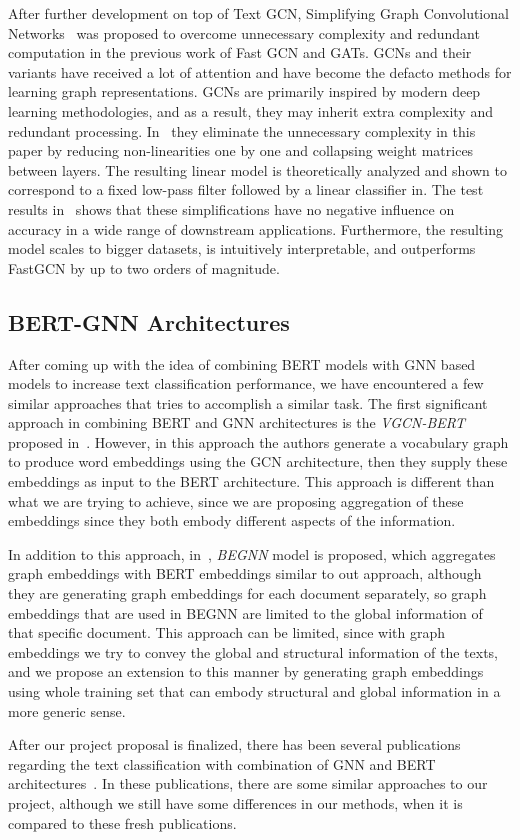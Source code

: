 After further development on top of Text GCN, Simplifying Graph Convolutional Networks~\autocite{simplfyingGCN2019} was proposed to overcome unnecessary complexity and redundant computation in the previous work of Fast GCN and GATs. GCNs and their variants have received a lot of attention and have become the defacto methods for learning graph representations. GCNs are primarily inspired by modern deep learning methodologies, and as a result, they may inherit extra complexity and redundant processing. In~\autocite{simplfyingGCN2019} they eliminate the unnecessary complexity in this paper by reducing non-linearities one by one and collapsing weight matrices between layers. The resulting linear model is theoretically analyzed and shown to correspond to a fixed low-pass filter followed by a linear classifier in. The test results in~\autocite{simplfyingGCN2019} shows that these simplifications have no negative influence on accuracy in a wide range of downstream applications. Furthermore, the resulting model scales to bigger datasets, is intuitively interpretable, and outperforms FastGCN by up to two orders of magnitude.

\subsection{BERT-GNN Architectures}\label{sec:related:bertgnn}
After coming up with the idea of combining BERT models with GNN based models to increase text classification performance, we have encountered a few similar approaches that tries to accomplish a similar task. The first significant approach in combining BERT and GNN architectures is the \emph{VGCN-BERT} proposed in~\autocite{zhibin2020vgcn}. However, in this approach the authors generate a vocabulary graph to produce word embeddings using the GCN architecture, then they supply these embeddings as input to the BERT architecture. This approach is different than what we are trying to achieve, since we are proposing aggregation of these embeddings since they both embody different aspects of the information.

In addition to this approach, in~\autocite{yang2021bertenhanced}, \emph{BEGNN} model is proposed, which aggregates graph embeddings with BERT embeddings similar to out approach, although they are generating graph embeddings for each document separately, so graph embeddings that are used in BEGNN are limited to the global information of that specific document. This approach can be limited, since with graph embeddings we try to convey the global and structural information of the texts, and we propose an extension to this manner by generating graph embeddings using whole training set that can embody structural and global information in a more generic sense.

After our project proposal is finalized, there has been several publications regarding the text classification with combination of GNN and BERT architectures~\autocite{lin2022bertgcn,she2022bertgcnattention,zeng2022boosting}. In these publications, there are some similar approaches to our project, although we still have some differences in our methods, when it is compared to these fresh publications.
